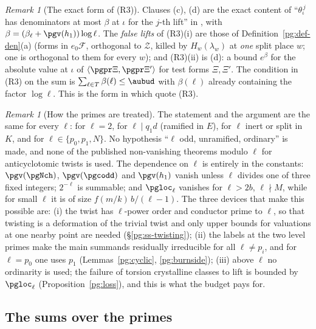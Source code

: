 \documentclass[10pt]{amsart}
\theoremstyle{definition}
\theoremstyle{remark}
\newtheorem{remark}[theorem]{Remark}
\begin{document}
\begin{remark}[The exact form of (R3)]\label{pg:rem-R3}
Clauses (c), (d) are the exact content of ``$\theta_\iota^{\,j}$ has denominators at most
$\beta$ at $\iota$ for the $j$-th lift'' in {\cite[Definition~14.39(R3)]{P46}}, with
$\beta=(\beta_\ell+\pgv(h_1))\log\ell$. The \emph{false lifts} of (R3)(i) are those of
Definition~\ref{pg:def-den}(a) (forms in $e_0\mathcal F$, orthogonal to $\mathcal Z$, killed by
$H_w(\lambda_w)$ at \emph{one} split place $w$; one is orthogonal to them for every $w$); and
(R3)(ii) is (d): a bound $e^{\beta}$ for the absolute value at $\iota$ of
$\langle\pgpr\Xi,\pgpr\Xi'\rangle$ for test forms $\Xi,\Xi'$. The condition in (R3) on the sum is
$\sum_{\ell\in T}\beta(\ell)\le\aubud$ with $\beta(\ell)$ already containing the factor
$\log\ell$. This is the form in which {\cite[Propositions~14.41(b), 14.42 and~14.43]{P46}} quote (R3).
\end{remark}

\begin{remark}[How the primes are treated]\label{pg:rem-primes}
The statement and the argument are the same for every $\ell$: for $\ell=2$, for $\ell\mid q_1d$
(ramified in $E$), for $\ell$ inert or split in $K$, and for $\ell\in\{p_0,p_1,N\}$. No hypothesis
``$\ell$ odd, unramified, ordinary'' is made, and none of the published non-vanishing theorems
modulo $\ell$ for anticyclotomic twists is used. The dependence on $\ell$ is entirely in the
constants: $\pgv(\pgNch)$, $\pgv(\pgcodd)$ and $\pgv(h_1)$ vanish unless $\ell$ divides one of three
fixed integers; $2^{-\ell}$ is summable; and $\pgloc_\ell$ vanishes for $\ell>2b$,
$\ell\nmid M$, while for small $\ell$ it is of size $f(m/k)\,b/(\ell-1)$. The three devices that
make this possible are: (i) the twist has $\ell$-power order and conductor prime to $\ell$, so that
twisting is a deformation of the trivial twist and only upper bounds for valuations at one nearby
point are needed (\S\ref{pg:ss-twisting}); (ii) the labels at the two level primes make the main
summands residually irreducible for all $\ell\ne p_i$, and for $\ell=p_0$ one uses $p_1$
(Lemmas~\ref{pg:cyclic}, \ref{pg:burnside}); (iii) above $\ell$ no ordinarity is used; the failure
of torsion crystalline classes to lift is bounded by $\pgloc_\ell$ (Proposition~\ref{pg:loss}), and
this is what the budget pays for.
\end{remark}

\subsection{The sums over the primes}\label{pg:ss-sums}
\end{document}
